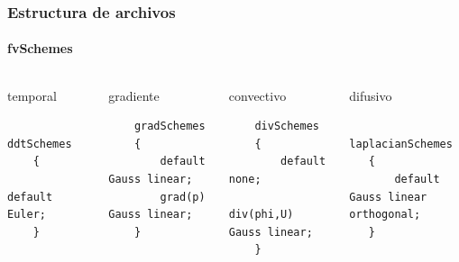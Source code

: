 \begin{frame}[fragile]
    \frametitle{Estructura de archivos}
    \framesubtitle{fvSchemes}

\vspace{-0.8cm}
    \begin{columns}
        
            
            \begin{block}{\centering temporal}
        
            \tiny
            \begin{verbatim}
    ddtSchemes
    {
        default         Euler;
    }     
            \end{verbatim}                
            \end{block}


            \begin{block}{\centering gradiente}
        
            \tiny
            \begin{verbatim}
    gradSchemes
    {
        default         Gauss linear;
        grad(p)         Gauss linear;
    }
            \end{verbatim}                
            \end{block}
                
        
        \begin{block}{\centering convectivo}

        \tiny
        \begin{verbatim}
    divSchemes
    {
        default         none;
        div(phi,U)      Gauss linear;
    }
        \end{verbatim}
                
        \end{block} 
        
        
        
        \begin{block}{\centering difusivo}

        \tiny
        \begin{verbatim}
   laplacianSchemes
   {
       default   Gauss linear orthogonal;
   }
        \end{verbatim}
                
        \end{block}                

        
    \end{columns}
    


\end{frame} 








